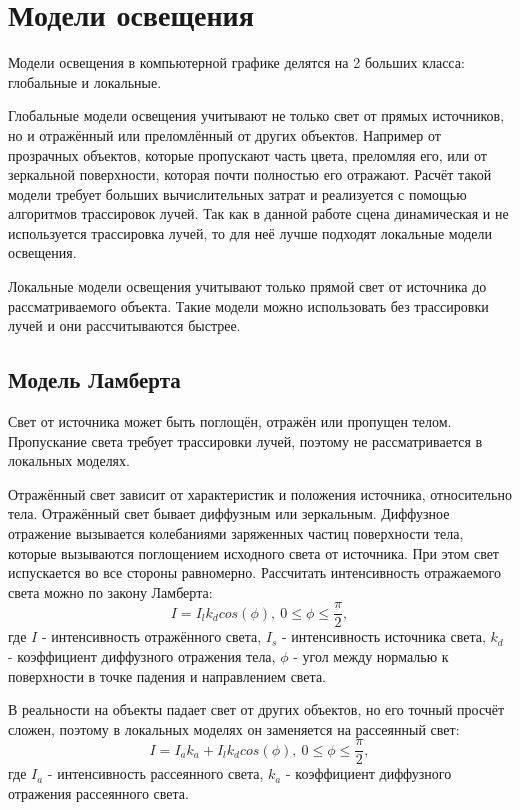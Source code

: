 \section{Модели освещения}
Модели освещения в компьютерной графике делятся на 2 больших класса: глобальные и локальные.

Глобальные модели освещения учитывают не только свет от прямых источников, но и отражённый или преломлённый от других объектов. Например от прозрачных объектов, которые пропускают часть цвета, преломляя его, или от зеркальной поверхности, которая почти полностью его отражают. Расчёт такой модели требует больших вычислительных затрат и реализуется с помощью алгоритмов трассировок лучей. Так как в данной работе сцена динамическая и не используется трассировка лучей, то для неё лучше подходят локальные модели освещения.

Локальные модели освещения учитывают только прямой свет от источника до рассматриваемого объекта. Такие модели можно использовать без трассировки лучей и они рассчитываются быстрее.

\subsection{Модель Ламберта}
Свет от источника может быть поглощён, отражён или пропущен телом. Пропускание света требует трассировки лучей, поэтому не рассматривается в локальных моделях.

Отражённый свет зависит от характеристик и положения источника, относительно тела. Отражённый свет бывает диффузным или зеркальным. Диффузное отражение вызывается колебаниями заряженных частиц поверхности тела, которые вызываются поглощением исходного света от источника. При этом свет испускается во все стороны равномерно. Рассчитать интенсивность отражаемого света можно по закону Ламберта:
\begin{equation}
	\label{eq:lambert1}
	I = I_{l}k_dcos(\phi),\ 0\leq\phi\leq\frac{\pi}{2},
\end{equation}
где $I$ - интенсивность отражённого света, $I_s$ - интенсивность источника света, $k_d$ - коэффициент диффузного отражения тела, $\phi$ - угол между нормалью к поверхности в точке падения и направлением света.

В реальности на объекты падает свет от других объектов, но его точный просчёт сложен, поэтому в локальных моделях он заменяется на рассеянный свет:
\begin{equation}
	\label{eq:lambert2}
	I = I_ak_a + I_{l}k_dcos(\phi),\ 0\leq\phi\leq\frac{\pi}{2},
\end{equation}
где $I_a$ - интенсивность рассеянного света, $k_a$ - коэффициент диффузного отражения рассеянного света. 

